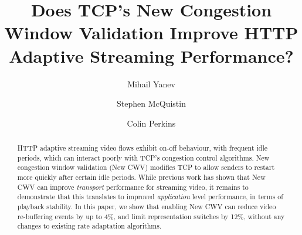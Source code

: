 \documentclass[10pt,sigconf]{acmart}
\begin{document}
\title{Does TCP's New Congestion Window Validation Improve HTTP Adaptive Streaming Performance?}

\author{Mihail Yanev}

  \author{Stephen McQuistin}

\author{Colin Perkins}


\begin{abstract}

HTTP adaptive streaming video flows exhibit on-off behaviour, with frequent idle periods, which can interact poorly with TCP's congestion control algorithms. New congestion window validation (New CWV) modifies TCP to allow senders to restart more quickly after certain idle periods. While previous work has shown that New CWV can improve \emph{transport} performance for streaming video, it remains to demonstrate that this translates to improved \emph{application} level performance, in terms of playback stability. In this paper, we show that enabling New CWV can reduce video re-buffering events by up to 4\%, and limit representation switches by 12\%, without any changes to existing rate adaptation algorithms.

\end{abstract}
\maketitle
\end{document}
